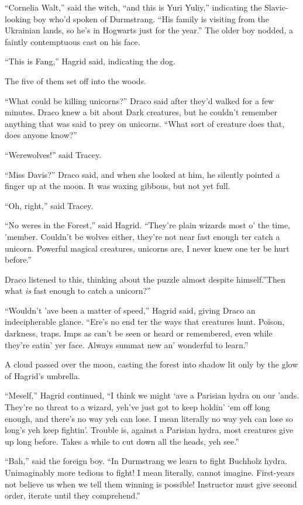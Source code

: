 ``Cornelia Walt,'' said the witch, ``and this is Yuri Yuliy,''
indicating the Slavic-looking boy who'd spoken of Durmstrang. ``His
family is visiting from the Ukrainian lands, so he's in Hogwarts just
for the year.'' The older boy nodded, a faintly contemptuous cast on his
face.

``This is Fang,'' Hagrid said, indicating the dog.

The five of them set off into the woods.

``What could be killing unicorns?'' Draco said after they'd walked for a
few minutes. Draco knew a bit about Dark creatures, but he couldn't
remember anything that was said to prey on unicorns. ``What sort of
creature does that, does anyone know?''

``Werewolves!'' said Tracey.

``Miss Davis?'' Draco said, and when she looked at him, he silently
pointed a finger up at the moon. It was waxing gibbous, but not yet
full.

``Oh, right,'' said Tracey.

``No weres in the Forest,'' said Hagrid. ``They're plain wizards most o'
the time, 'member. Couldn't be wolves either, they're not near fast
enough ter catch a unicorn. Powerful magical creatures, unicorns are, I
never knew one ter be hurt before.''

Draco listened to this, thinking about the puzzle almost despite
himself.''Then what \emph{is} fast enough to catch a unicorn?''

``Wouldn't 'ave been a matter of speed,'' Hagrid said, giving Draco an
indecipherable glance. ``Ere's no end ter the ways that creatures hunt.
Poison, darkness, traps. Imps as can't be seen or heard or remembered,
even while they're eatin' yer face. Always summat new an' wonderful to
learn.''

A cloud passed over the moon, casting the forest into shadow lit only by
the glow of Hagrid's umbrella.

``Meself,'' Hagrid continued, ``I think we might `ave a Parisian hydra
on our 'ands. They're no threat to a wizard, yeh've just got to keep
holdin' `em off long enough, and there's no way yeh can lose. I mean
literally no way yeh can lose so long's yeh keep fightin'. Trouble is,
against a Parisian hydra, most creatures give up long before. Takes a
while to cut down all the heads, yeh see.''

``Bah,'' said the foreign boy. ``In Durmstrang we learn to fight
Buchholz hydra. Unimaginably more tedious to fight! I mean literally,
cannot imagine. First-years not believe us when we tell them winning is
possible! Instructor must give second order, iterate until they
comprehend.''

